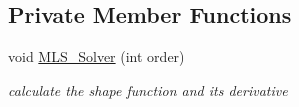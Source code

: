 \subsection*{Private Member Functions}
\begin{CompactItemize}
\item 
\hypertarget{classMLS_7c7baa105805cd17714d35e351283bf7}{
void \hyperlink{classMLS_7c7baa105805cd17714d35e351283bf7}{MLS\_\-Solver} (int order)}
\label{classMLS_7c7baa105805cd17714d35e351283bf7}

\begin{CompactList}\small\item\em calculate the shape function and its derivative \item\end{CompactList}\end{CompactItemize}
